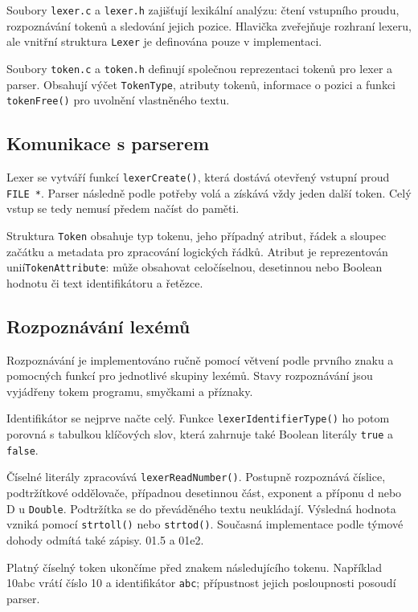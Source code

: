 \documentclass{article}
\begin{document}
Soubory \texttt{lexer.c} a \texttt{lexer.h} zajišťují lexikální analýzu: čtení vstupního proudu, rozpoznávání tokenů a sledování jejich pozice. Hlavička zveřejňuje rozhraní lexeru, ale vnitřní struktura \texttt{Lexer} je definována pouze v implementaci.

Soubory \texttt{token.c} a \texttt{token.h} definují společnou reprezentaci tokenů pro lexer a parser. Obsahují výčet \texttt{TokenType}, atributy tokenů, informace o pozici a funkci \texttt{tokenFree()} pro uvolnění vlastněného textu.

\subsection{Komunikace s parserem}

Lexer se vytváří funkcí \texttt{lexerCreate()}, která dostává otevřený vstupní proud \texttt{FILE *}. Parser následně podle potřeby volá  a získává vždy jeden další token. Celý vstup se tedy nemusí předem načíst do paměti.

Struktura \texttt{Token} obsahuje typ tokenu, jeho případný atribut, řádek a sloupec začátku a metadata pro zpracování logických řádků. Atribut je reprezentován unií\texttt{TokenAttribute}: může obsahovat celočíselnou, desetinnou nebo Boolean hodnotu či text identifikátoru a řetězce.

\subsection{Rozpoznávání lexémů}

Rozpoznávání je implementováno ručně pomocí větvení podle prvního znaku a pomocných funkcí pro jednotlivé skupiny lexémů. Stavy rozpoznávání jsou vyjádřeny tokem programu, smyčkami a příznaky.

Identifikátor se nejprve načte celý. Funkce \texttt{lexerIdentifierType()} ho potom porovná s tabulkou klíčových slov, která zahrnuje také Boolean literály \texttt{true} a \texttt{false}.

Číselné literály zpracovává \texttt{lexerReadNumber()}. Postupně rozpoznává číslice, podtržítkové oddělovače, případnou desetinnou část, exponent a příponu d nebo D u \texttt{Double}. Podtržítka se do převáděného textu neukládají. Výsledná hodnota vzniká pomocí \texttt{strtoll()} nebo \texttt{strtod()}. Současná implementace podle týmové dohody odmítá také zápisy. 01.5 a 01e2.

Platný číselný token ukončíme před znakem následujícího tokenu. Například 10abc vrátí číslo 10 a identifikátor \texttt{abc}; přípustnost jejich posloupnosti posoudí parser.
\end{document}
